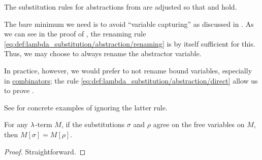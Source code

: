 \begin{remark}\label{rem:renaming_substitution_rules}
  The substitution rules for abstractions from  are adjusted so that  and  hold.

  The bare minimum we need is to avoid \enquote{variable capturing} as discussed in . As we can see in the proof of , the renaming rule \eqref{eq:def:lambda_substitution/abstraction/renaming} is by itself sufficient for this. Thus, we may choose to always rename the abstractor variable.

  In practice, however, we would prefer to not rename bound variables, especially in \hyperref[def:lambda_combinator]{combinators}; the rule \eqref{eq:def:lambda_substitution/abstraction/direct} allow us to prove .

  See  for concrete examples of ignoring the latter rule.
\end{remark}

\begin{proposition}\label{thm:lambda_substitution_restriction}
  For any \( \mathrm{\lambda} \)-term \( M \), if the substitutions \( \sigma \) and \( \rho \) agree on the free variables on \( M \), then \( M[\sigma] = M[\rho] \).
\end{proposition}
\begin{proof}
  Straightforward.
\end{proof}

